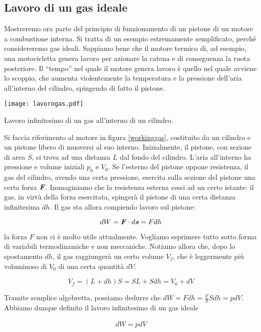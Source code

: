 \subsection{Lavoro di un gas ideale}
Mostreremo ora parte del principio di funzionamento di un pistone
di un motore a combustione interna. Si tratta di un esempio estremamente
semplificato, perché considereremo gas ideali.
Sappiamo bene che il motore termico di, ad esempio, una motocicletta
genera lavoro per azionare la catena e di conseguenza la ruota posteriore.
Il ``tempo'' nel quale il motore genera lavoro è quello nel quale
avviene lo scoppio, che aumenta violentemente la temperatura e la
pressione dell'aria all'interno del cilindro, spingendo di fatto il
pistone.

\begin{marginfigure}
    \centering
    \texttt{[image: lavorogas.pdf]}
    \caption{Lavoro infinitesimo di un gas all'interno di un cilindro.}
    \label{workinggas}
\end{marginfigure}

Si faccia riferimento al motore in figura \ref{workinggas}, costituito
da un cilindro e un pistone libero di muoversi al suo interno. Inizialmente, il pistone,
con sezione di area $S$, si trova ad una distanza $L$ dal fondo del cilindro.
L'aria all'interno ha pressione e volume iniziali $p_0$ e $V_0$. Se l'esterno
del pistone oppone resistenza, il gas del cilindro, avendo una certa pressione,
esercita sulla sezione del pistone una certa forza $\textbf{\textit{F}}$. Immaginiamo
che la resistenza esterna cessi ad un certo istante: il gas, in virtù della forza
esercitata, spingerà il pistone di una certa distanza infinitesima $dh$.
Il gas sta allora compiendo lavoro sul pistone:

\[ dW = \textbf{\textit{F}} \cdot d\textbf{\textit{s}} = Fdh \]

\noindent la forza $F$ non ci è molto utile attualmente. Vogliamo esprimere
tutto sotto forma di variabili termodinamiche e non meccaniche. Notiamo
allora che, dopo lo spostamento $dh$, il gas raggiungerà un certo volume
$V_f$, che è leggermente più voluminoso di $V_0$ di una certa quantità $dV$:

\[ V_f = (L + dh)S = SL + Sdh = V_0 + dV \]

\noindent Tramite semplice algebretta, possiamo dedurre che
$dW = Fdh = \frac{F}{S}Sdh = pdV$. Abbiamo dunque definito
il lavoro infinitesimo di un gas ideale

\begin{align}
    dW = pdV
\end{align}


